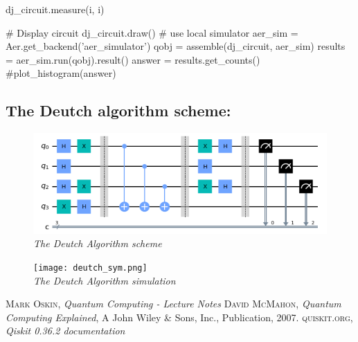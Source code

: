\documentclass{article}
\begin{document}
{\hspace{0.5cm}
\begin{minipage}{0.3\textwidth}
dj\_circuit.measure(i, i)
 \end{minipage}
\newline
\newline
\# Display circuit
\newline
dj\_circuit.draw()
\newline
\newline
\# use local simulator
\newline
aer\_sim = Aer.get\_backend('aer\_simulator')
\newline
qobj = assemble(dj\_circuit, aer\_sim)
\newline
results = aer\_sim.run(qobj).result()
\newline
answer = results.get\_counts()
\newline
\#plot\_histogram(answer)
}
\newpage
\subsection{The Deutch algorithm scheme:}
\begin{figure}[h]
\begin{minipage}[b]{8cm}
\centering
\includegraphics[width=12cm]{deutch_schema2.png}\\\textit{The Deutch Algorithm scheme}
\end{minipage}
\end{figure}
\begin{figure}[h]
\begin{minipage}[b]{8cm}
\centering
\texttt{[image: deutch\_sym.png]}\\\textit{The Deutch Algorithm simulation}
\end{minipage}
\end{figure}
\newpage
\begin{thebibliography}{x}
    {\scshape Mark Oskin}, {\itshape Quantum Computing - Lecture Notes}
    {\scshape David McMahon}, {\itshape Quantum Computing Explained}, A John Wiley \& Sons, Inc., Publication, 2007.
    {\scshape quiskit.org}, {\itshape Qiskit 0.36.2 documentation}
\end{thebibliography}
\end{document}

